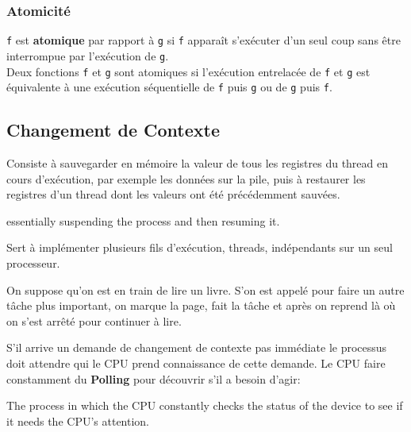 \documentclass{article}
\begin{document}
\subsubsection{Atomicité}
\begin{definition}\label{def:atomicite}
    \texttt{f} est \textbf{atomique} par rapport à \texttt{g} si \texttt{f} apparaît s'exécuter d'un seul coup sans être interrompue par l'exécution de \texttt{g}.\\

    Deux fonctions \texttt{f} et \texttt{g} sont atomiques si l'exécution entrelacée de \texttt{f} et \texttt{g} est équivalente à une exécution séquentielle de \texttt{f} puis \texttt{g} ou de \texttt{g} puis \texttt{f}.
\end{definition}


\subsection{Changement de Contexte}
\begin{definition}
    Consiste à sauvegarder en mémoire la valeur de tous les registres du thread en cours d'exécution, par exemple les données sur la pile, puis à restaurer les registres d'un thread dont les valeurs ont été précédemment sauvées.

    \begin{phrase}
        essentially suspending the process and then resuming it.
    \end{phrase}

    \begin{remark}
        Sert à implémenter plusieurs fils d'exécution, threads, indépendants sur un seul processeur.
    \end{remark}

    \begin{example}
        On suppose qu'on est en train de lire un livre. S'on est appelé pour faire un autre tâche plus important, on marque la page, fait la tâche et après on reprend là où on s'est arrêté pour continuer à lire.
    \end{example}
\end{definition}
S'il arrive un demande de changement de contexte pas immédiate le processus doit attendre qui le CPU prend connaissance de cette demande. Le CPU faire constamment du \textbf{Polling} pour découvrir s'il a besoin d'agir:
\begin{definition}
    The process in which the CPU constantly checks the status of the device to see if it needs the CPU's attention.
\end{definition}
\end{document}
